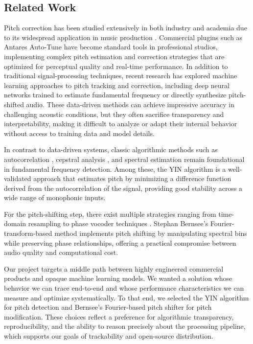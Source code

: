 \documentclass[sigconf]{acmart}
\begin{document}

    \subsection{Related Work}
    Pitch correction has been studied extensively in both industry and academia due to its widespread application in music production \cite{diaz2009fate}. Commercial plugins such as Antares Auto-Tune \cite{antares_autotune_website} have become standard tools in professional studios, implementing complex pitch estimation and correction strategies that are optimized for perceptual quality and real-time performance. In addition to traditional signal-processing techniques, recent research has explored machine learning approaches to pitch tracking and correction, including deep neural networks \cite{wager2020deep} trained to estimate fundamental frequency or directly synthesize pitch-shifted audio. These data-driven methods can achieve impressive accuracy in challenging acoustic conditions, but they often sacrifice transparency and interpretability, making it difficult to analyze or adapt their internal behavior without access to training data and model details.

    In contrast to data-driven systems, classic algorithmic methods such as autocorrelation \cite{upadhya2012pitch}, cepstral analysis \cite{noll1967cepstrum}, and spectral estimation \cite{vincent2009adaptive} remain foundational in fundamental frequency detection. Among these, the YIN algorithm \cite{de2002yin} is a well-validated approach \cite{sukhostat2015comparative} that estimates pitch by minimizing a difference function derived from the autocorrelation of the signal, providing good stability across a wide range of monophonic inputs.

    For the pitch-shifting step, there exist multiple strategies ranging from time-domain resampling \cite{laroche2002time} to phase vocoder techniques \cite{flanagan1966phase}. Stephan Bernsee’s Fourier-transform-based \cite{bernsee_pitch_shifting_ft} method implements pitch shifting by manipulating spectral bins while preserving phase relationships, offering a practical compromise between audio quality and computational cost.

    Our project targets a middle path between highly engineered commercial products and opaque machine learning models. We wanted a solution whose behavior we can trace end-to-end and whose performance characteristics we can measure and optimize systematically. To that end, we selected the YIN algorithm for pitch detection and Bernsee’s Fourier-based pitch shifter for pitch modification. These choices reflect a preference for algorithmic transparency, reproducibility, and the ability to reason precisely about the processing pipeline, which supports our goals of trackability and open-source distribution.
\end{document}
